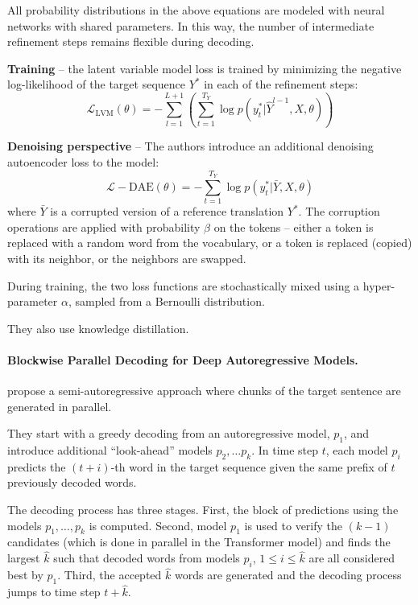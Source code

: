 All probability distributions in the above equations are modeled with neural
networks with shared parameters. In this way, the number of intermediate
refinement steps remains flexible during decoding.

\textbf{Training} -- the latent variable model loss is trained by minimizing the
negative log-likelihood of the target sequence $Y^*$ in each of the refinement
steps:
\begin{equation}
  \mathcal{L}_{\text{LVM}}(\theta) = - \sum_{l=1}^{L+1} \left(
    \sum_{t=1}^{T_Y} \log p(y_t^* | \hat{Y}^{l-1}, X, \theta)
  \right) \label{eq:refinement-lvm-loss}
\end{equation}


\textbf{Denoising perspective} -- The authors introduce an additional denoising
autoencoder loss to the model:
\begin{equation}
  \mathcal{L}-{\text{DAE}}(\theta) = - \sum_{t=1}^{T_Y} \log p(y_t^* | \bar{Y}, X, \theta)
\end{equation}
where $\bar{Y}$ is a corrupted version of a reference translation $Y^*$. The
corruption operations are applied with probability $\beta$ on the tokens --
either a token is replaced with a random word from the vocabulary, or a token is
replaced (copied) with its neighbor, or the neighbors are swapped.

During training, the two loss functions are stochastically mixed using a
hyper-parameter $\alpha$, sampled from a Bernoulli distribution.

They also use knowledge distillation.


\paragraph{Blockwise Parallel Decoding for Deep Autoregressive Models.}
\citet{stern2018blockwise} propose a semi-autoregressive approach where chunks
of the target sentence are generated in parallel.

They start with a greedy decoding from an autoregressive model, $p_1$, and
introduce additional ``look-ahead'' models $p_2, \ldots p_k$. In time step $t$,
each model $p_i$ predicts the $(t + i)$-th word in the target sequence given the
same prefix of $t$ previously decoded words.

The decoding process has three stages. First, the block of predictions using the
models $p_1, \ldots, p_k$ is computed. Second, model $p_1$ is used to verify the
$(k-1)$ candidates (which is done in parallel in the Transformer model) and
finds the largest $\hat{k}$ such that decoded words from models $p_i$,
$1 \leq i \leq \hat{k}$ are all considered best by $p_1$. Third, the accepted
$\hat{k}$ words are generated and the decoding process jumps to time step
$t + \hat{k}$.



